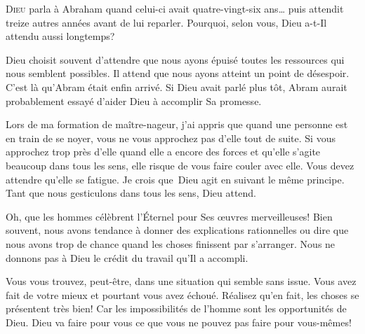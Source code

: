 



\lettrine{D}{ieu} parla à Abraham quand celui-ci avait quatre-vingt-six
 ans\dots{} puis attendit treize autres années avant de lui reparler.
 Pourquoi, selon vous, Dieu a-t-Il attendu aussi longtemps? 

Dieu choisit souvent d'attendre que nous ayons épuisé toutes les ressources
 qui nous semblent possibles.
 Il attend que nous ayons atteint un point de désespoir.
 C'est là qu'Abram était enfin arrivé.
 Si Dieu avait parlé plus tôt, Abram aurait probablement essayé
 d'aider Dieu à accomplir Sa promesse. 

Lors de ma formation de maître-nageur, j'ai appris que quand une personne
 est en train de se noyer, vous ne vous approchez pas d'elle tout de suite.
 Si vous approchez trop près d'elle quand elle a encore des forces
 et qu'elle s'agite beaucoup dans tous les sens,
 elle risque de vous faire couler avec elle.
 Vous devez attendre qu'elle se fatigue.
 Je crois que~Dieu agit en suivant le même principe.
 Tant que nous gesticulons dans tous les sens, Dieu attend. 


\Og Oh, que les hommes célèbrent l'Éternel pour
 Ses \oe{}uvres merveilleuses! \Fg{}
 Bien souvent, nous avons tendance à donner des explications rationnelles
 ou dire que nous avons trop de chance quand les choses finissent
 par s'arranger.
 Nous ne donnons pas à Dieu le crédit du travail qu'Il a accompli. 

Vous vous trouvez, peut-être, dans une situation qui semble sans issue.
 Vous avez fait de votre mieux et pourtant vous avez échoué.
 Réalisez qu'en fait, les choses se présentent très bien!
 Car les impossibilités de l'homme sont les opportunités de Dieu.
 Dieu va faire pour vous ce que vous ne pouvez pas faire pour vous-mêmes! 

\dvrule



